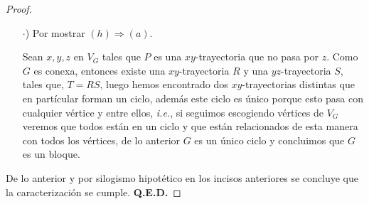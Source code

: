 \documentclass{article}
\begin{document}
\begin{enumerate}
\begin{proof}
\begin{itemize}
    \item[$\cdot$)] Por mostrar $(h) \Rightarrow (a)$.
      
      Sean $x, y, z$ en $V_G$ tales que $P$ es una $xy$-trayectoria que no pasa por $z$.
      Como $G$ es conexa, entonces existe una $xy$-trayectoria $R$ y una $yz$-trayectoria
      $S$, tales que, $T = RS$, luego hemos encontrado dos $xy$-trayectorias distintas que
      en partícular forman un ciclo, además este ciclo es único porque esto pasa con cualquier
      vértice y entre ellos, \textit{i.e.}, si seguimos escogiendo vértices de $V_G$ veremos que
      todos están en un ciclo y que están relacionados de esta manera con todos los vértices, de
      lo anterior $G$ es un único ciclo y concluimos que $G$ es un bloque.
    \end{itemize}

    De lo anterior y por silogismo hipotético en los incisos anteriores se concluye que la
    caracterización se cumple. \hfill \textbf{Q.E.D.}
  \end{proof}
\end{enumerate}
\end{document}
